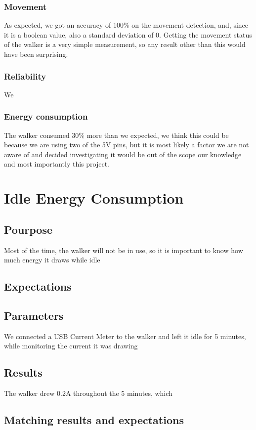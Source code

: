 		\subsubsection{Movement}
			As expected, we got an accuracy of 100\% on the movement detection, and, since it is a boolean value, also a standard deviation of 0. Getting the movement status of the walker is a very simple measurement, so any result other than this would have been surprising.

		\subsubsection{Reliability}
			We 

		\subsubsection{Energy consumption}
			The walker consumed 30\% more than we expected, we think this could be because we are using two of the 5V pins, but it is most likely a factor we are not aware of and decided investigating it would be out of the scope our knowledge and most importantly this project.

\section{Idle Energy Consumption}

	\subsection{Pourpose}
		Most of the time, the walker will not be in use, so it is important to know how much energy it draws while idle
	\subsection{Expectations}

	\subsection{Parameters}
		We connected a USB Current Meter to the walker and left it idle for 5 minutes, while monitoring the current it was drawing
	\subsection{Results}
		The walker drew 0.2A throughout the 5 minutes, which
	\subsection{Matching results and expectations}

